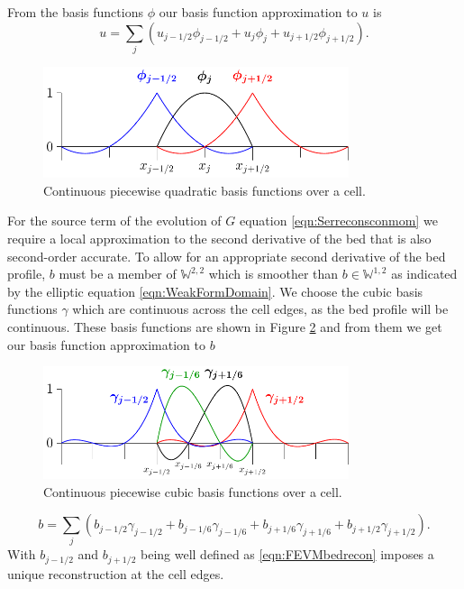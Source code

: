 From the basis functions $\phi$ our basis function approximation to $u$ is
\begin{equation}
u = \sum_j \left(u_{j-1/2}\phi_{j-1/2} + u_{j}\phi_{j} + u_{j+1/2}\phi_{j+1/2} \right).
\label{eqn:FEapproxtou}
\end{equation}

\begin{figure}
	\centering
	\includegraphics[width=0.8\textwidth]{./chp3/figures/P2.pdf}
	\caption{Continuous piecewise quadratic basis functions over a cell.}
	\label{fig:P2ContBasis}
\end{figure}

For the source term of the evolution of $G$ equation \eqref{eqn:Serreconsconmom} we require a local approximation to the second derivative of the bed that is also second-order accurate. To allow for an appropriate second derivative of the bed profile, $b$ must be a member of $\mathbb{W}^{2,2}$ which is smoother than $b \in \mathbb{W}^{1,2}$ as indicated by the elliptic equation \eqref{eqn:WeakFormDomain}. We choose the cubic basis functions $\gamma$ which are continuous across the cell edges, as the bed profile will be continuous. These basis functions are shown in Figure \ref{fig:P3ContBasis} and from them we get our basis function approximation to $b$
\begin{figure}
	\centering
	\includegraphics[width=0.8\textwidth]{./chp3/figures/P3.pdf}
	\caption{Continuous piecewise cubic basis functions over a cell.}
	\label{fig:P3ContBasis}
\end{figure}
\begin{equation}
b = \sum_j \left( b_{j-1/2}\gamma_{j-1/2} + b_{j-1/6}\gamma_{j-1/6}  + b_{j+1/6}\gamma_{j+1/6} + b_{j+1/2}\gamma_{j+1/2} \right).
\label{eqn:FEapproxtob}
\end{equation}
With $b_{j-1/2}$ and $b_{j+1/2}$ being well defined as \eqref{eqn:FEVMbedrecon} imposes a unique reconstruction at the cell edges. 

